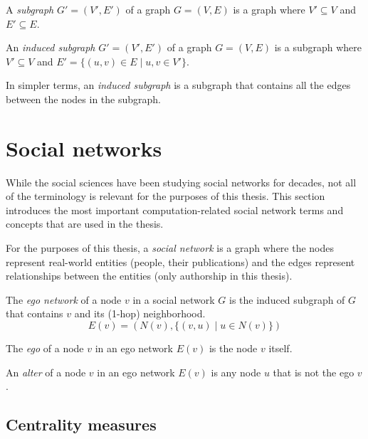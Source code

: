 \begin{definition}[Subgraph]
    A \textit{subgraph} $G' = (V', E')$ of a graph $G = (V, E)$ is a graph where $V' \subseteq V$ and $E' \subseteq E$.
\end{definition}

\begin{definition}
    An \textit{induced subgraph} $G' = (V', E')$ of a graph $G = (V, E)$ is a subgraph where $V' \subseteq V$ and $E' = \{ (u, v) \in E \mid u, v \in V' \}$.

    In simpler terms, an \textit{induced subgraph} is a subgraph that contains all the edges between the nodes in the subgraph.
\end{definition}

\section{Social networks}

While the social sciences have been studying social networks for decades, not all of the terminology is relevant for the purposes of this thesis.
This section introduces the most important computation-related social network terms and concepts that are used in the thesis.

For the purposes of this thesis, a \textit{social network} is a graph where the nodes represent real-world entities (people, their publications) and the edges represent relationships between the entities (only authorship in this thesis).

\begin{definition}
    The \textit{ego network} of a node $v$ in a social network $G$ is the induced subgraph of $G$ that contains $v$ and its (1-hop) neighborhood.
    $$
    E(v) = (N(v), \{ (v, u) \mid u \in N(v) \})
    $$
\end{definition}

\begin{definition}
    The \textit{ego} of a node $v$ in an ego network $E(v)$ is the node $v$ itself.
\end{definition}

\begin{definition}
    An \textit{alter} of a node $v$ in an ego network $E(v)$ is any node $u$ that is not the ego $v$.
\end{definition}

\subsection{Centrality measures}

